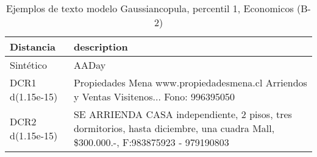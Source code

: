 \begin{table}[H]
\centering
\fontsize{10}{14}\selectfont
\caption{Ejemplos de texto modelo Gaussiancopula, percentil 1, Economicos (B-2)}
\label{table-example-economicos-b-2-gaussiancopula-1p-text}
\begin{tabular}{|l|m{35em}|}
\hline
\rowcolor[gray]{0.8}
Distancia & description \\
\hline Sintético & AADay \\
\hline DCR1 d(1.15e-15) & Propiedades Mena www.propiedadesmena.cl Arriendos y Ventas Visitenos... Fono: 996395050 \\
\hline DCR2 d(1.15e-15) & SE ARRIENDA CASA independiente, 2 pisos, tres dormitorios, hasta diciembre, una cuadra Mall, \$300.000.-, F:983875923 - 979190803 \\
\hline
\end{tabular}
\end{table}
